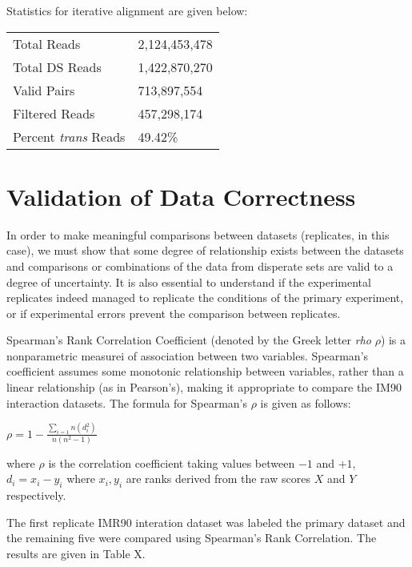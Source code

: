 \documentclass[phd,tocprelim]{cornell}
\begin{document}
Statistics for iterative alignment are given below:

\begin{center}
  \begin{table}
    \begin{tabular}{l l}
    Total Reads & 2,124,453,478 \\
    Total DS Reads & 1,422,870,270 \\
    Valid Pairs & 713,897,554 \\
    Filtered Reads & 457,298,174 \\
    Percent \textit{trans} Reads & 49.42\% \\
    \end{tabular}
  \end{table}
\end{center}


\chapter{Validation of Data Correctness}

In order to make meaningful comparisons between datasets (replicates,
in this case), we must show that some degree of relationship exists between
the datasets and comparisons or combinations of the data from disperate sets
are valid to a degree of uncertainty.  It is also essential to understand if the
experimental replicates indeed managed to replicate the conditions of the primary
experiment, or if experimental errors prevent the comparison between replicates.

Spearman's Rank Correlation Coefficient (denoted by the Greek letter \textit{rho}
$\rho$) is a nonparametric measurei of association between two variables.
Spearman's coefficient assumes some monotonic relationship between variables,
rather than a linear relationship (as in Pearson's), making it appropriate
to compare the IM90 interaction datasets.  The formula for Spearman's $\rho$ is
given as follows:

$
\rho = 1 - \frac{\sum_{i=1}{n}(d_i^2)}{n(n^2 - 1)}
$

where $\rho$ is the correlation coefficient taking values between $-1$ and $+1$,
$d_i = x_i - y_i$ where $x_i, y_i$ are ranks derived from the raw scores $X$ and
$Y$ respectively.

The first replicate IMR90 interation dataset was labeled the primary dataset
and the remaining five were compared using Spearman's Rank Correlation.  The
results are given in Table X.
\end{document}

